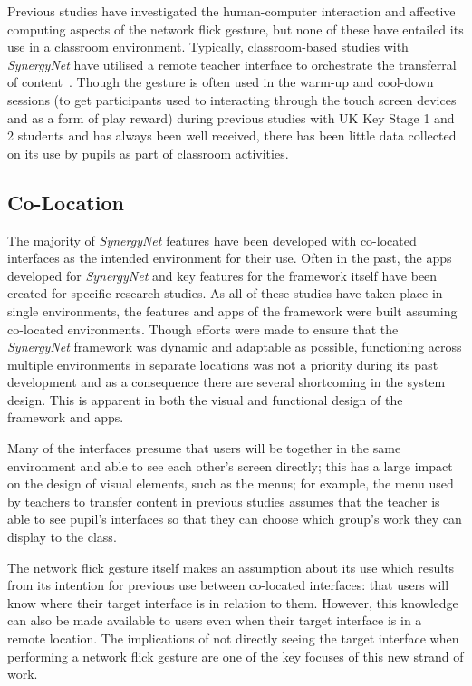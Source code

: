 \documentclass[a4paper,11pt]{article}
\begin{document}
Previous studies have investigated the human-computer interaction and affective computing aspects of the network flick gesture, but none of these have entailed its use in a classroom environment.
Typically, classroom-based studies with {\emph{SynergyNet}} have utilised a remote teacher interface to orchestrate the transferral of content~\cite{joycegibbons:2016}.
Though the gesture is often used in the warm-up and cool-down sessions (to get participants used to interacting through the touch screen devices and as a form of play reward) during previous studies with UK Key Stage 1 and 2 students and has always been well received, there has been little data collected on its use by pupils as part of classroom activities.

\subsection{Co-Location}

The majority of {\emph{SynergyNet}} features have been developed with co-located interfaces as the intended environment for their use.
Often in the past, the apps developed for {\emph{SynergyNet}} and key features for the framework itself have been created for specific research studies.
As all of these studies have taken place in single environments, the features and apps of the framework were built assuming co-located environments.
Though efforts were made to ensure that the {\emph{SynergyNet}} framework was dynamic and adaptable as possible, functioning across multiple environments in separate locations was not a priority during its past development and as a consequence there are several shortcoming in the system design.
This is apparent in both the visual and functional design of the framework and apps.

Many of the interfaces presume that users will be together in the same environment and able to see each other's screen directly; this has a large impact on the design of visual elements, such as the menus; for example, the menu used by teachers to transfer content in previous studies assumes that the teacher is able to see pupil's interfaces so that they can choose which group's work they can display to the class.

The network flick gesture itself makes an assumption about its use which results from its intention for previous use between co-located interfaces: that users will know where their target interface is in relation to them.
However, this knowledge can also be made available to users even when their target interface is in a remote location.
The implications of not directly seeing the target interface when performing a network flick gesture are one of the key focuses of this new strand of work.
\end{document}
